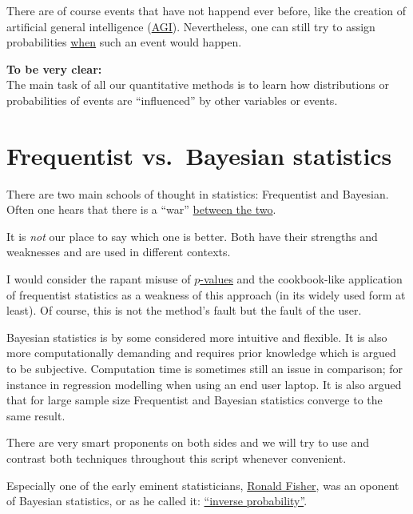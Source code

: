 \documentclass[
]{book}
\begin{document}
There are of course events that have not happend ever before, like the creation of artificial general intelligence (\href{https://en.wikipedia.org/wiki/Artificial_general_intelligence}{AGI}).
Nevertheless, one can still try to assign probabilities \href{https://research.aimultiple.com/artificial-general-intelligence-singularity-timing/}{when} such an event would happen.

\textbf{To be very clear:}\\
The main task of all our quantitative methods is to learn how distributions or probabilities of events
are ``influenced'' by other variables or events.

\section{Frequentist vs.~Bayesian statistics}\label{frequentist-vs.-bayesian-statistics}

There are two main schools of thought in statistics: Frequentist and Bayesian. Often one hears that there is a ``war'' \href{https://www.youtube.com/watch?v=8wVq5aGzSqY&t=22s&ab_channel=VeryNormal}{between the two}.

It is \emph{not} our place to say which one is better. Both have their strengths and weaknesses and are used in different contexts.

I would consider the rapant misuse of \href{https://www.sciencedirect.com/science/article/abs/pii/S0037196308000620?via\%3Dihub}{\(p\)-values} and the
cookbook-like application of frequentist statistics as a weakness of this approach (in its widely used form at least).
Of course, this is not the method's fault but the fault of the user.

Bayesian statistics is by some considered more intuitive and flexible. It is also more computationally demanding and requires prior knowledge which is argued to be subjective.
Computation time is sometimes still an issue in comparison; for instance in regression modelling when using an end user laptop.
It is also argued that for large sample size Frequentist and Bayesian statistics converge to the same result.

There are very smart proponents on both sides and we will try to use and contrast both techniques throughout this script whenever convenient.

Especially one of the early eminent statisticians, \href{https://en.wikipedia.org/wiki/Ronald_Fisher}{Ronald Fisher}, was an oponent of Bayesian statistics,
or as he called it: \href{https://errorstatistics.com/wp-content/uploads/2016/02/fisher-1930-inverse-probability.pdf}{``inverse probability''}.
\end{document}
